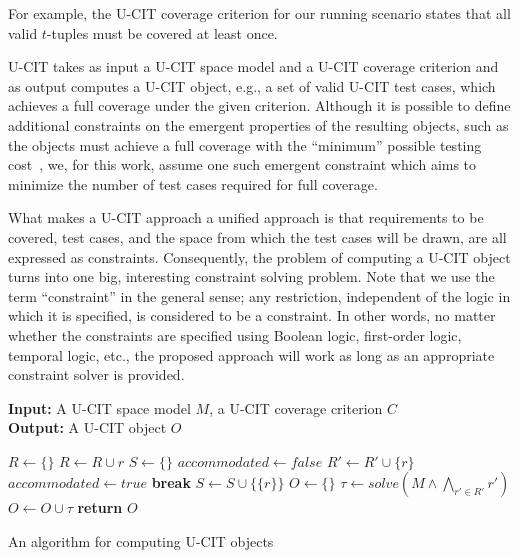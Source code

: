 \documentclass[EPiC]{easychair}
\begin{document}
For example, the U-CIT coverage criterion for our running scenario states that all valid $t$-tuples must be covered at least once.

U-CIT takes as input a U-CIT space model and a U-CIT coverage criterion and as output computes a U-CIT object, e.g., a set of valid U-CIT test cases, which achieves a full coverage under the given criterion. Although it is possible to define additional constraints on the emergent properties of the resulting objects, such as the objects must achieve a full coverage with the ``minimum'' possible testing cost~\cite{demiroz2012cost}, we, for this work, assume one such emergent constraint which aims to minimize the number of test cases required for full coverage.
 
What makes a U-CIT approach a unified approach is that requirements to be covered, test cases, and the space from which the test cases will be drawn, are all expressed as constraints. Consequently, the problem of computing a U-CIT object turns into one big, interesting constraint solving  problem. Note that we use the term ``constraint'' in the general sense; any restriction, independent of the logic in which it is specified, is considered to be a constraint. In other words, no matter whether the constraints are specified using Boolean logic, first-order logic, temporal logic, etc., the proposed approach will work as long as an appropriate constraint solver is provided.

\begin{algorithm}[t]
{\bf Input:} A U-CIT space model $M$,  a U-CIT coverage criterion $C$ \\
{\bf Output:} A U-CIT object $O$ \\ 
\vspace*{-0.5cm}
\begin{algorithmic}[1]
\State $R \leftarrow \{\}$
   \State $R \leftarrow R \cup r$
   \EndIf
\EndFor 
\State 
{}
\State $S \leftarrow \{\}$  
	\State $accommodated \leftarrow false$
			\State $R' \leftarrow R' \cup \{r\}$
			\State $accommodated \leftarrow true$
			\State \textbf{break}
		\EndIf			\EndFor
	    \State $S \leftarrow S \cup \{\{r\}\}$     
	\EndIf		
\EndFor
\State 
{}
\State $O \leftarrow \{\}$  
    \State $\tau \leftarrow solve(M \wedge \bigwedge_{r' \in R'} r')$
    \State $O \leftarrow O \cup \tau$
\EndFor
\State \textbf{return} $O$ 
\end{algorithmic}
\caption{An algorithm for computing U-CIT objects}
\label{algo:approach1}
\end{algorithm}
\end{document}
